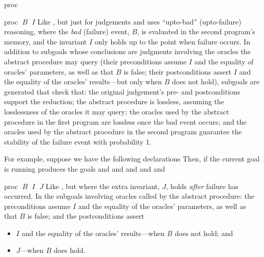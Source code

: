 \begin{tactic}{proc}
  \begin{tsyntax}{proc $\;B$ $\;I$}
    Like , but just for \prhl judgements and uses
    ``upto-bad'' (upto-failure) reasoning, where the \emph{bad}
    (failure) event, $B$, is evaluated in the second program's memory,
    and the invariant $I$ only holds up to the point when failure
    occurs.  In addition to subgoals whose conclusions are \prhl
    judgments involving the oracles the abstract procedure may query
    (their preconditions assume $I$ and the equality of oracles'
    parameters, as well as that $B$ is false; their
    postconditions assert $I$ and the equality of the oracles'
    results---but only when $B$ does not hold), subgoals are generated
    that check that: the original judgement's pre- and postconditions
    support the reduction; the abstract procedure is lossless,
    assuming the losslessness of the oracles it may query; the oracles
    used by the abstract procedure in the first program are lossless
    once the bad event occurs; and the oracles used by the abstract
    procedure in the second program guarantee the stability of the
    failure event with probability 1.

  \bigskip
  For example, suppose we have the following declarations
  Then, if the current goal is
  running 
  produces the goals
  and
  and
  and
  and
  and
  \end{tsyntax}

  \begin{tsyntax}{proc $\;B$ $\;I$ $\;J$}
    Like , but where the extra invariant, $J$,
    holds \emph{after} failure has occurred.  In the \prhl subgoals
    involving oracles called by the abstract procedure: the
    preconditions assume $I$ and the equality of the oracles'
    parameters, as well as that $B$ is
    false; and the postconditions assert
    \begin{itemize}
    \item $I$ and the equality of the oracles' results---when $B$ does
      not hold; and

    \item $J$---when $B$ does hold.
    \end{itemize}


\end{tsyntax}
\end{tactic}
